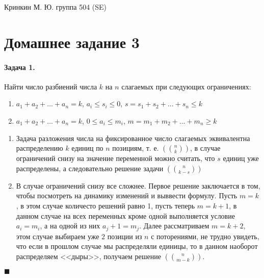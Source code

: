 \documentclass[a4paper,12pt]{article}
\begin{document}
\sloppy

\lstset{
	basicstyle=\small,
	stringstyle=\ttfamily,
	showstringspaces=false,
	columns=fixed,
	breaklines=true,
	numbers=right,
	numberstyle=\tiny
}

\newtheorem{Def}{Определение}[section]
\newtheorem{Th}{Теорема}
\newtheorem{Lem}[Th]{Лемма}
\newenvironment{Proof}
	{\par\noindent{\bf Доказательство.}}
	{\hfill$\scriptstyle\blacksquare$}
\newenvironment{Solution}
	{\par\noindent{\bf Решение.}}
	{\hfill$\scriptstyle\blacksquare$}


\begin{flushright}
	Кринкин М. Ю. группа 504 (SE)
\end{flushright}

\section{Домашнее задание 3}

\paragraph{Задача 1.} Найти число разбиений числа $k$ на $n$ слагаемых при следующих ограничениях:
\begin{enumerate}
\item $a_1+a_2+...+a_n=k$, $a_i \le s_i \le 0$, $s=s_1+s_2+...+s_n \le k$

\item $a_1+a_2+...+a_n=k$, $0 \le a_i \le m_i$, $m=m_1+m_2+...+m_n \ge k$
\end{enumerate}

\begin{Solution}
\begin{enumerate}
\item Задача разложения числа на фиксированное число слагаемых эквивалентна распределению $k$ единиц по $n$ позициям, т. е. $\left(\binom{n}{k}\right)$, в случае ограничений снизу на значение переменной можно считать, что $s$ единиц уже распределены, а следовательно решение задачи $\left(\binom{n}{k-s}\right)$

\item В случае ограничений снизу все сложнее. Первое решение заключается в том, чтобы посмотреть на динамику изменений и выввести формулу. Пусть $m = k$, в этом случае количесто решений равно 1, пусть теперь $m = k+1$, в данном случае на всех переменных кроме одной выполняется условие $a_i=m_i$, а на одной из них $a_j+1 = m_j$. Далее рассматриваем $m=k+2$,  этом случае выбираем уже $2$ позиции из $n$ с поторениями, не трудно увидеть, что если в прошлом случае мы распределяли единицы, то в данном наоборот распределяем <<дыры>>, получаем решение $\left(\binom{n}{m-k}\right)$.
\end{enumerate}
\end{Solution}
\end{document}
